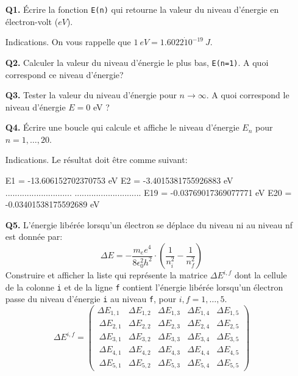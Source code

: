 \documentclass[a4paper,11pt]{article}
\theoremstyle{mytheor}
\begin{document}
\begin{itemize}
\item[\textbf{Q1.}] Écrire la fonction \texttt{E(n)} qui retourne la valeur du niveau d'énergie en électron-volt ($eV$).


\begin{bclogo}[logo=\bclampe, couleurBarre=green, noborder=true, couleur=yellow!10]{Indications.}
On vous rappelle que $1 \ eV = 1.6022 \dot 10^{-19} \ J$.
\end{bclogo}

\item[\textbf{Q2.}] Calculer la valeur du niveau d'énergie le plus bas, \texttt{E(n=1)}. A quoi correspond ce niveau d'énergie?

\item[\textbf{Q3.}] Tester la valeur du niveau d'énergie pour $n \rightarrow \infty$. A quoi correspond le niveau d'énergie $E = 0$ eV ?

\item[\textbf{Q4.}] Écrire une boucle qui calcule et affiche le niveau d'énergie $E_n$ pour $n = 1,\dots, 20$.

\begin{bclogo}[logo=\bclampe, couleurBarre=green, noborder=true, couleur=yellow!10]{Indications.}
Le résultat doit être comme suivant:
\begin{pyshell}
E1 = -13.606152702370753 eV
E2 = -3.4015381755926883 eV
............................
............................
E19 = -0.03769017369077771 eV
E20 = -0.03401538175592689 eV
\end{pyshell}
\end{bclogo}
\item[\textbf{Q5.}] L'énergie libérée lorsqu'un électron se déplace du niveau ni au niveau nf est donnée par:
\begin{equation}
\Delta E = -\frac{m_e e^4}{8\epsilon_0^2h^2}\cdot\left( \frac{1}{n_i^2}-\frac{1}{n_f^2}\right)
\end{equation}
Construire et afficher la liste qui représente la matrice $\Delta E^{i,f}$ dont la cellule de la colonne \texttt{i} et de la ligne \texttt{f} contient l'énergie libérée lorsqu'un électron passe du niveau d'énergie \texttt{i} au niveau \texttt{f}, pour $i, f = 1,\dots, 5$.
\begin{equation}
\Delta E^{i,f} = \begin{pmatrix}
\Delta  E_{1,1}  & \Delta  E_{1,2}  & \Delta  E_{1,3}  & \Delta  E_{1,4}  & \Delta  E_{1,5} \\\
\Delta E_{2,1}  & \Delta  E_{2,2}  & \Delta  E_{2,3}  & \Delta  E_{2,4}  & \Delta  E_{2,5} \\\
\Delta E_{3,1}  & \Delta  E_{3,2}  & \Delta  E_{3,3}  & \Delta  E_{3,4}  & \Delta  E_{3,5} \\\
\Delta E_{4,1}  & \Delta  E_{4,2}  & \Delta  E_{4,3}  & \Delta  E_{4,4}  & \Delta  E_{4,5} \\\
\Delta E_{5,1}  & \Delta  E_{5,2}  & \Delta  E_{5,3}  & \Delta  E_{5,4}  & \Delta  E_{5,5}
\end{pmatrix}
\end{equation}
\end{itemize}
\end{document}

